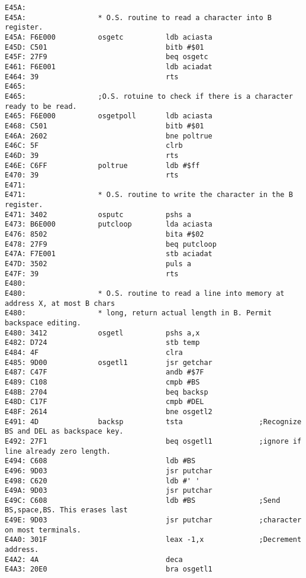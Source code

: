 {\begin{verbatim}
E45A:                 
E45A:                 * O.S. routine to read a character into B register.
E45A: F6E000          osgetc          ldb aciasta
E45D: C501                            bitb #$01
E45F: 27F9                            beq osgetc
E461: F6E001                          ldb aciadat
E464: 39                              rts
E465:                 
E465:                 ;O.S. rotuine to check if there is a character ready to be read.
E465: F6E000          osgetpoll       ldb aciasta
E468: C501                            bitb #$01
E46A: 2602                            bne poltrue
E46C: 5F                              clrb
E46D: 39                              rts
E46E: C6FF            poltrue         ldb #$ff
E470: 39                              rts
E471:                 
E471:                 * O.S. routine to write the character in the B register.
E471: 3402            osputc          pshs a
E473: B6E000          putcloop        lda aciasta
E476: 8502                            bita #$02
E478: 27F9                            beq putcloop
E47A: F7E001                          stb aciadat
E47D: 3502                            puls a
E47F: 39                              rts
E480:                 
E480:                 * O.S. routine to read a line into memory at address X, at most B chars
E480:                 * long, return actual length in B. Permit backspace editing.
E480: 3412            osgetl          pshs a,x
E482: D724                            stb temp
E484: 4F                              clra
E485: 9D00            osgetl1         jsr getchar
E487: C47F                            andb #$7F               
E489: C108                            cmpb #BS
E48B: 2704                            beq backsp
E48D: C17F                            cmpb #DEL
E48F: 2614                            bne osgetl2       
E491: 4D              backsp          tsta                  ;Recognize BS and DEL as backspace key.
E492: 27F1                            beq osgetl1           ;ignore if line already zero length.
E494: C608                            ldb #BS
E496: 9D03                            jsr putchar
E498: C620                            ldb #' '
E49A: 9D03                            jsr putchar
E49C: C608                            ldb #BS               ;Send BS,space,BS. This erases last
E49E: 9D03                            jsr putchar           ;character on most terminals.
E4A0: 301F                            leax -1,x             ;Decrement address.
E4A2: 4A                              deca
E4A3: 20E0                            bra osgetl1

\end{verbatim}}
